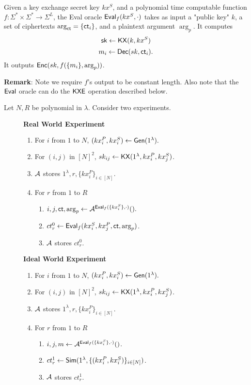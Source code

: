 \begin{definition}
\label{defn:ack-oracle}
Given a key exchange secret key $kx^S$, and a polynomial time computable function $f: \Sigma^* \times \Sigma^* \to \Sigma^L$, the Eval oracle $\mathsf{Eval}_{f}(kx^S, \cdot)$ takes as input a "public key" $k$, a set of ciphertexts $\arg_{\mathsf{ct}} = \{\mathsf{ct}_i\}$, and a plaintext argument $\arg_{p}$. It computes 
$${\mathsf{sk}} \leftarrow \mathsf{KX}(k, kx^S)$$
$$m_i \leftarrow \mathsf{Dec}(sk, \mathsf{ct}_i).$$ 
It outputs $\mathsf{Enc}(sk, f(\{m_i\}, \arg_p))$.
\end{definition}
\textbf{Remark}: Note we require $f$'s output to be constant length. Also note that the $\mathsf{Eval}$ oracle can do the $\mathsf{KXE}$ operation described below.
\begin{definition}
\label{defn:sym-security}
Let $N, R$ be polynomial in $\lambda$. Consider two experiments.
\begin{figure}[h!]
\begin{framed}
\textbf{Real World Experiment}
\begin{enumerate}
    \item For $i$ from $1$ to $N$, $(kx_i^P, kx_i^S) \leftarrow \mathsf{Gen}(1^{\lambda}).$
    \item For $(i, j)$ in $[N]^2$, $sk_{ij} \leftarrow \mathsf{KX}(1^{\lambda}, kx_i^P, kx_j^S)$.
    \item $\mathcal{A}$ stores $1^{\lambda}, r, \{kx_i^P\}_{i \in [N]}$.
    \item For $r$ from $1$ to $R$
    \begin{enumerate}
        \item $i, j, \mathsf{ct}, \arg_p \leftarrow \mathcal{A}^{\mathsf{Eval}_f(\{kx_i^S\}, \cdot)}().$
        \item $ct^{0}_r \leftarrow \mathsf{Eval}_f(kx_i^S, kx_j^P, \mathsf{ct}, \arg_p)$.
        \item $\mathcal{A}$ stores $ct^{0}_r$.
    \end{enumerate}
\end{enumerate}
\textbf{Ideal World Experiment}
\begin{enumerate}
    \item For $i$ from $1$ to $N$, $(kx_i^P, kx_i^S) \leftarrow \mathsf{Gen}(1^{\lambda}).$
    \item For $(i, j)$ in $[N]^2$, $sk_{ij} \leftarrow \mathsf{KX}(1^{\lambda}, kx_i^P, kx_j^S)$.
    \item $\mathcal{A}$ stores $1^{\lambda}, r, \{kx_i^P\}_{i \in [N]}$.
    \item For $r$ from $1$ to $R$
    \begin{enumerate}
        \item $i, j, m \leftarrow \mathcal{A}^{\mathsf{Eval}_f(\{kx_i^S\}, \cdot)}()$.
        \item $ct^1_r \leftarrow \mathsf{Sim}(1^{\lambda}, \{(kx_i^P, kx_i^S)\}_{i \in [N]})$.
        \item $\mathcal{A}$ stores $ct^{1}_r$.
    \end{enumerate}
\end{enumerate}
\end{framed}
\end{figure}


\end{definition}
